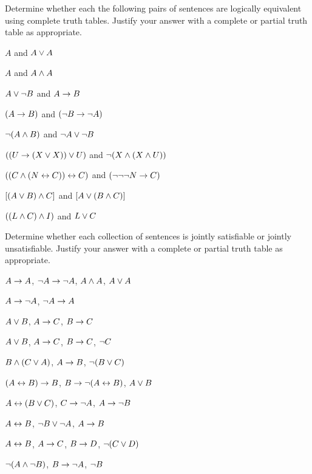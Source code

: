 \noindent\problempart
Determine whether each the following pairs of sentences are logically equivalent using complete truth tables. Justify your answer with a complete or partial truth table as appropriate.
\begin{compactlist}
\item $A$ and $A \vee A$
\item $A$ and $A \wedge A$
\item $A \vee \neg B$ and $A\rightarrow B$
\item $(A \rightarrow B)$ and $(\neg B \rightarrow \neg A)$
\item $\neg(A \wedge B)$ and $\neg A \vee \neg B$
\item $ ((U \rightarrow (X \vee X)) \vee U)$ and $\neg (X \wedge (X \wedge U))$
\item $ ((C \wedge (N \leftrightarrow C)) \leftrightarrow C)$ and $(\neg \neg \neg N \rightarrow C)$
\item $[(A \vee B) \wedge C]$ and $[A \vee (B \wedge C)]$
\item $((L \wedge C) \wedge I)$ and $L \vee C$
\end{compactlist}


\noindent\problempart
\label{pr.TT.satisfiable5}
Determine whether each collection of sentences is jointly satisfiable or jointly unsatisfiable. Justify your answer with a complete or partial truth table as appropriate.
\begin{compactlist}
\item $A\rightarrow A$, $\neg A \rightarrow \neg A$, $A\wedge A$, $A\vee A$ \vspace{.5ex} \hfill {}
\item $A \rightarrow \neg A$, $\neg A \rightarrow A$\vspace{.5ex} \hfill {}
\item $A\vee B$, $A\rightarrow C$, $B\rightarrow C$\vspace{.5ex} \hfill {}
\item $A \vee B$, $A \rightarrow C$, $B \rightarrow C$, $\neg C$\vspace{.5ex} \hfill {}
\item $B\wedge(C\vee A)$, $A\rightarrow B$, $\neg(B\vee C)$\vspace{.5ex}  \hfill {}
\item $(A \leftrightarrow B) \rightarrow B$,  $B \rightarrow \neg (A \leftrightarrow B)$, $A \vee B$ \vspace{.5ex} \hfill {}
\item $A\leftrightarrow(B\vee C)$, $C\rightarrow \neg A$, $A\rightarrow \neg B$\vspace{.5ex} \hfill {}
\item  $A \leftrightarrow B$,  $\neg B \vee \neg A$,  $A \rightarrow  B$ \vspace{.5ex} \hfill {}
\item $A \leftrightarrow B$, $A \rightarrow C$, $B \rightarrow D$, $\neg(C \vee D)$\vspace{.5ex} \hfill {}
\item $\neg (A \wedge \neg B)$,  $B \rightarrow \neg A$, $\neg B$  \vspace{.5ex} \hfill {}
\end{compactlist}

